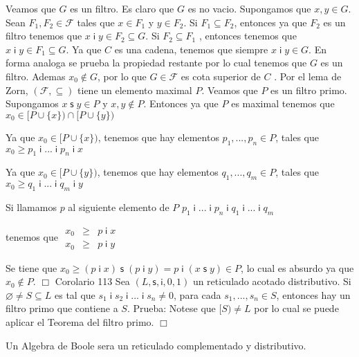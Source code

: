 Veamos que \(G\) es un filtro. Es claro que \(G\) es no vacio. Supongamos que \( x,y\in G\). Sean \(F_{1},F_{2}\in \mathcal{F}\) tales que \(x\in F_{1}\) y \(y\in F_{2}\). Si \(F_{1}\subseteq F_{2}\), entonces ya que \(F_{2}\) es un filtro tenemos que \(x\;\mathsf{i\;}y\in F_{2}\subseteq G\). Si \(F_{2}\subseteq F_{1}\) , entonces tenemos que \(x\;\mathsf{i\;}y\in F_{1}\subseteq G\). Ya que \(C\) es una cadena, tenemos que siempre \(x\;\mathsf{i\;}y\in G\). En forma analoga se prueba la propiedad restante por lo cual tenemos que \(G\) es un filtro. Ademas \(x_{0}\notin G\), por lo que \(G\in \mathcal{F}\) es cota superior de \(C\) . Por el lema de Zorn, \((\mathcal{F},\subseteq )\) tiene un elemento maximal \( P\). Veamos que \(P\) es un filtro primo. Supongamos \(x\;\mathsf{s\;}y\in P\) y \( x,y\notin P\). Entonces ya que \(P\) es maximal tenemos que
\(\displaystyle x_{0}\in \lbrack P\cup \{x\})\cap \lbrack P\cup \{y\}) \)

Ya que \(x_{0}\in \lbrack P\cup \{x\})\), tenemos que hay elementos \( p_{1},...,p_{n}\in P\), tales que
\(\displaystyle x_{0}\geq p_{1}\;\mathsf{i\;}...\;\mathsf{i\;}p_{n}\;\mathsf{i\;}x \)

Ya que \(x_{0}\in \lbrack P\cup \{y\})\), tenemos que hay elementos \( q_{1},...,q_{m}\in P\), tales que
\(\displaystyle x_{0}\geq q_{1}\;\mathsf{i\;}...\;\mathsf{i\;}q_{m}\;\mathsf{i\;}y \)

Si llamamos \(p\) al siguiente elemento de \(P\)
\(\displaystyle p_{1}\;\mathsf{i\;}...\;\mathsf{i\;}p_{n}\;\mathsf{i\;}q_{1}\;\mathsf{i\;} ...\;\mathsf{i\;}q_{m} \)

tenemos que
\(\displaystyle \begin{array}{rcl} x_{0} & \geq & p\;\mathsf{i\;}x \\ x_{0} & \geq & p\;\mathsf{i\;}y \end{array} \)

Se tiene que \(x_{0}\geq (p\;\mathsf{i\;}x)\;\mathsf{s\;}(p\;\mathsf{i\;} y)=p\;\mathsf{i\;}(x\;\mathsf{s\;}y)\in P\), lo cual es absurdo ya que \( x_{0}\notin P\). \(\Box\)
Corolario 113 Sea \((L,\mathsf{s},\mathsf{i},0,1)\) un reticulado acotado distributivo. Si \( \varnothing \neq S\subseteq L\) es tal que \(s_{1}\;\mathsf{i\;}s_{2}\;\mathsf{ i\;}...\;\mathsf{i\;}s_{n}\neq 0\), para cada \(s_{1},...,s_{n}\in S\), entonces hay un filtro primo que contiene a \(S\).
Prueba: Notese que \([S)\neq L\) por lo cual se puede aplicar el Teorema del filtro primo. \(\Box\)

Un Algebra de Boole sera un reticulado complementado y distributivo.


